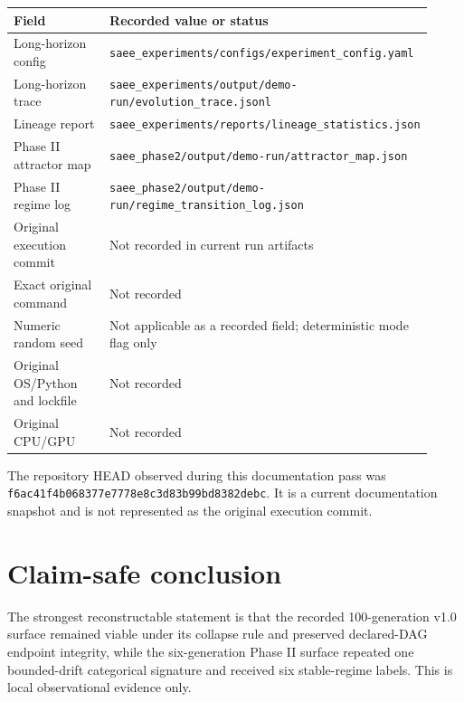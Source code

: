 \documentclass[10pt]{article}
\begin{document}
\begin{center}
\begin{tabular}{@{}p{0.31\linewidth}p{0.61\linewidth}@{}}
\toprule
Field & Recorded value or status \\
\midrule
Long-horizon config & \texttt{saee\_experiments/configs/experiment\_config.yaml} \\
Long-horizon trace & \texttt{saee\_experiments/output/demo-run/evolution\_trace.jsonl} \\
Lineage report & \texttt{saee\_experiments/reports/lineage\_statistics.json} \\
Phase II attractor map & \texttt{saee\_phase2/output/demo-run/attractor\_map.json} \\
Phase II regime log & \texttt{saee\_phase2/output/demo-run/regime\_transition\_log.json} \\
Original execution commit & Not recorded in current run artifacts \\
Exact original command & Not recorded \\
Numeric random seed & Not applicable as a recorded field; deterministic mode flag only \\
Original OS/Python and lockfile & Not recorded \\
Original CPU/GPU & Not recorded \\
\bottomrule
\end{tabular}
\end{center}

The repository HEAD observed during this documentation pass was
\texttt{f6ac41f4b068377e7778e8c3d83b99bd8382debc}. It is a current
documentation snapshot and is not represented as the original execution
commit.

\section{Claim-safe conclusion}

The strongest reconstructable statement is that the recorded 100-generation
v1.0 surface remained viable under its collapse rule and preserved declared-DAG
endpoint integrity, while the six-generation Phase II surface repeated one
bounded-drift categorical signature and received six stable-regime labels.
This is local observational evidence only.
\end{document}
